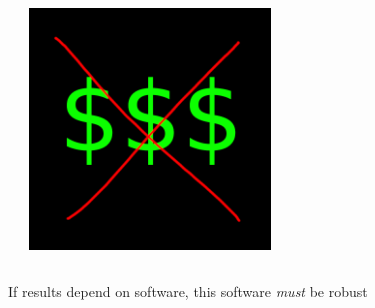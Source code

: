 \documentclass{beamer}
\begin{document}
\begin{frame}
\begin{columns}
\begin{columns}
\end{columns}
\center \includegraphics[width=0.5\textwidth]{money.png}
\end{columns}

\begin{center}
\large If results depend on software, this software \textit{must} be robust
\end{center}
\end{frame}
\end{document}
